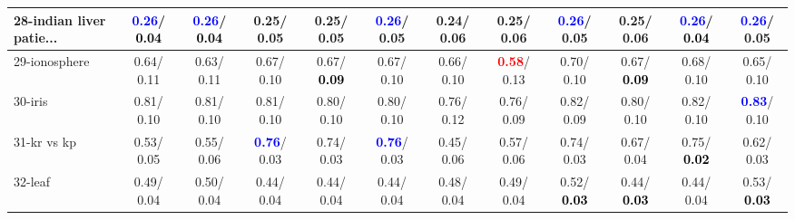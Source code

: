 \begin{table}[h]
\begin{center}
{\begin{tabular}{lc|c|c|c|c|c|c|c|c|c|c}
28-indian liver patie... & \textcolor{blue}{\textbf{  0.26}}/\textcolor{black}{\textbf{  0.04}} & \textcolor{blue}{\textbf{  0.26}}/\textcolor{black}{\textbf{  0.04}} &   0.25/  0.05 &   0.25/  0.05 & \textcolor{blue}{\textbf{  0.26}}/  0.05 &   0.24/  0.06 &   0.25/  0.06 & \textcolor{blue}{\textbf{  0.26}}/  0.05 &   0.25/  0.06 & \textcolor{blue}{\textbf{  0.26}}/\textcolor{black}{\textbf{  0.04}} & \textcolor{blue}{\textbf{  0.26}}/  0.05 \\ \hline
29-ionosphere &   0.64/  0.11 &   0.63/  0.11 &   0.67/  0.10 &   0.67/\textcolor{black}{\textbf{  0.09}} &   0.67/  0.10 &   0.66/  0.10 & \textcolor{red}{\textbf{  0.58}}/  0.13 &   0.70/  0.10 &   0.67/\textcolor{black}{\textbf{  0.09}} &   0.68/  0.10 &   0.65/  0.10 \\
30-iris &   0.81/  0.10 &   0.81/  0.10 &   0.81/  0.10 &   0.80/  0.10 &   0.80/  0.10 &   0.76/  0.12 &   0.76/  0.09 &   0.82/  0.09 &   0.80/  0.10 &   0.82/  0.10 & \textcolor{blue}{\textbf{  0.83}}/  0.10 \\
31-kr vs kp &   0.53/  0.05 &   0.55/  0.06 & \textcolor{blue}{\textbf{  0.76}}/  0.03 &   0.74/  0.03 & \textcolor{blue}{\textbf{  0.76}}/  0.03 &   0.45/  0.06 &   0.57/  0.06 &   0.74/  0.03 &   0.67/  0.04 &   0.75/\textcolor{black}{\textbf{  0.02}} &   0.62/  0.03 \\
32-leaf &   0.49/  0.04 &   0.50/  0.04 &   0.44/  0.04 &   0.44/  0.04 &   0.44/  0.04 &   0.48/  0.04 &   0.49/  0.04 &   0.52/\textcolor{black}{\textbf{  0.03}} &   0.44/\textcolor{black}{\textbf{  0.03}} &   0.44/  0.04 &   0.53/\textcolor{black}{\textbf{  0.03}} \\\end{tabular}}\label{stratsALCKappa0aNB}
\end{center}
\end{table}

